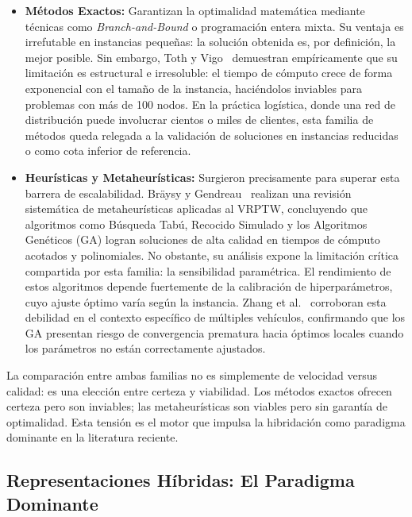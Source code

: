 \documentclass[letter, 10pt]{article}
\begin{document}
\begin{itemize}
\item \textbf{M\'etodos Exactos:} Garantizan la optimalidad matem\'atica mediante t\'ecnicas como \textit{Branch-and-Bound} o programaci\'on entera mixta. Su ventaja es irrefutable en instancias peque\~nas: la soluci\'on obtenida es, por definici\'on, la mejor posible. Sin embargo, Toth y Vigo~\cite{toth2002bra} demuestran emp\'iricamente que su limitaci\'on es estructural e irresoluble: el tiempo de c\'omputo crece de forma exponencial con el tama\~no de la instancia, haci\'endolos inviables para problemas con m\'as de 100 nodos. En la pr\'actica log\'istica, donde una red de distribuci\'on puede involucrar cientos o miles de clientes, esta familia de m\'etodos queda relegada a la validaci\'on de soluciones en instancias reducidas o como cota inferior de referencia.
\item \textbf{Heur\'isticas y Metaheur\'isticas:} Surgieron precisamente para superar esta barrera de escalabilidad. Br\"aysy y Gendreau~\cite{braysy2005meta} realizan una revisi\'on sistem\'atica de metaheur\'isticas aplicadas al VRPTW, concluyendo que algoritmos como B\'usqueda Tab\'u, Recocido Simulado y los Algoritmos Gen\'eticos (GA) logran soluciones de alta calidad en tiempos de c\'omputo acotados y polinomiales. No obstante, su an\'alisis expone la limitaci\'on cr\'itica compartida por esta familia: la sensibilidad param\'etrica. El rendimiento de estos algoritmos depende fuertemente de la calibraci\'on de hiperpar\'ametros, cuyo ajuste \'optimo var\'ia seg\'un la instancia. Zhang et al.~\cite{zhang2024application} corroboran esta debilidad en el contexto espec\'ifico de m\'ultiples veh\'iculos, confirmando que los GA presentan riesgo de convergencia prematura hacia \'optimos locales cuando los par\'ametros no est\'an correctamente ajustados.
\end{itemize}

La comparaci\'on entre ambas familias no es simplemente de velocidad versus calidad: es una elecci\'on entre certeza y viabilidad. Los m\'etodos exactos ofrecen certeza pero son inviables; las metaheur\'isticas son viables pero sin garant\'ia de optimalidad. Esta tensi\'on es el motor que impulsa la hibridaci\'on como paradigma dominante en la literatura reciente.

\subsection{Representaciones H\'ibridas: El Paradigma Dominante}
\end{document}
